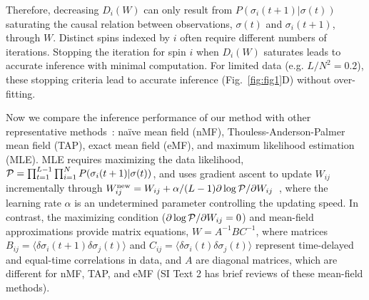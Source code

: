 \documentclass[prx,twocolumn,twoside,showpacs,superscriptaddress]{revtex4-1}
\begin{document}
Therefore, decreasing $D_i(W)$ can only result from $P(\sigma_i(t+1)|\sigma(t))$ saturating the causal relation between observations, $\sigma(t)$ and $\sigma_i(t+1)$, through $W.$ Distinct spins indexed by  $i$ often require different numbers of iterations.
Stopping the iteration for spin $i$ when $D_i(W)$ saturates leads to accurate inference with minimal computation.
For limited data (e.g. $L/N^2 = 0.2$), these stopping criteria lead to accurate inference (Fig.~\ref{fig:fig1}D) without over-fitting.

Now we compare the inference performance of our method with other representative methods~\cite{Roudi2011, Mezard2011, Zeng2013}: na\"ive mean field (nMF), Thouless-Anderson-Palmer mean field (TAP), exact mean field (eMF), and maximum likelihood estimation (MLE). 
MLE requires maximizing the data likelihood, ${\cal P} = \prod_{t=1}^{L-1} \prod_{i=1}^N P(\sigma_i(t+1)|\sigma(t))$, and uses gradient ascent to update $W_{ij}$ incrementally through $W^{\textrm{new}}_{ij} = W_{ij} + {\alpha}/({L-1}) {\partial \log {\cal P}}/{\partial W_{ij}}$~\cite{Roudi2011, Zeng2013},
where the learning rate $\alpha$ is an undetermined parameter controlling the updating speed.
In contrast, the maximizing condition ($\partial \log {\cal P}/{\partial W_{ij}}=0$) and mean-field approximations provide matrix equations,
$W=A^{-1}BC^{-1}$, where matrices $B_{ij} = \langle \delta \sigma_i(t+1) \delta \sigma_j(t) \rangle$ and $C_{ij}= \langle \delta \sigma_i(t) \delta \sigma_j(t) \rangle$ represent time-delayed and equal-time correlations in data, and $A$ are diagonal matrices, which are different for nMF, TAP, and eMF (SI Text 2 has brief reviews of these mean-field methods).
\end{document}
